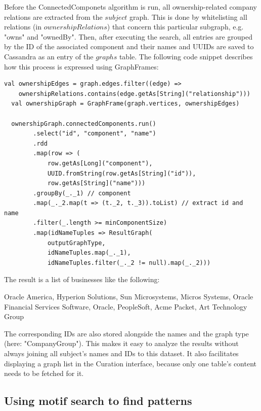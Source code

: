 \documentclass[
        a4paper,     %
        titlepage,   %
        oneside,     %
        parskip      %
        ]{scrartcl}  %
\begin{document}
  Before the ConnectedComponets algorithm is run, all ownership-related company
  relations are extracted from the $subject$ graph. This is done by whitelisting
  all relations (in $ownershipRelations$) that concern this particular subgraph,
  e.g. "owns" and "ownedBy".
  Then, after executing the search, all entries are grouped by the ID of the
  associated component and their names and UUIDs are saved to Cassandra
  as an entry of the $graphs$ table. The following code snippet describes how
  this process is expressed using GraphFrames:

  \begin{lstlisting}[style=scalaStyle,caption=Company Group Extraction]
  val ownershipEdges = graph.edges.filter((edge) =>
    ownershipRelations.contains(edge.getAs[String]("relationship")))
  val ownershipGraph = GraphFrame(graph.vertices, ownershipEdges)

  ownershipGraph.connectedComponents.run()
		.select("id", "component", "name")
		.rdd
		.map(row => (
			row.getAs[Long]("component"),
			UUID.fromString(row.getAs[String]("id")),
			row.getAs[String]("name")))
		.groupBy(_._1) // component
		.map(_._2.map(t => (t._2, t._3)).toList) // extract id and name
		.filter(_.length >= minComponentSize)
		.map(idNameTuples => ResultGraph(
			outputGraphType,
			idNameTuples.map(_._1),
			idNameTuples.filter(_._2 != null).map(_._2)))
  \end{lstlisting}

  The result is a list of businesses like the following:

  Oracle America, Hyperion Solutions, Sun Microsystems, Micros Systems, Oracle Financial Services Software, Oracle, PeopleSoft, Acme Packet, Art Technology Group

  The corresponding IDs are also stored alongside the names and the graph type (here: "CompanyGroup"). This makes it easy to analyze
  the results without always joining all subject's names and IDs to this dataset. It also facilitates displaying
  a graph list in the Curation interface, because only one table's content needs to be fetched for it.

  \subsection{Using motif search to find patterns}


  \pagebreak
\end{document}
